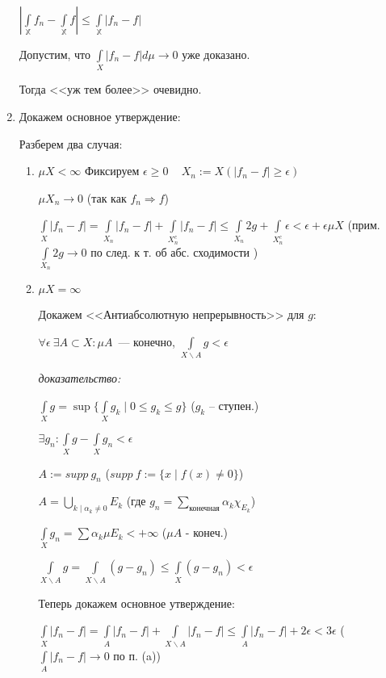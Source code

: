 \documentclass[paper=a4, fontsize=14pt]{report}
\begin{document}
\begin{flushleft}
\begin{enumerate}
	$ |\int\limits_{\mathbb{X}} f_n - \int\limits_{\mathbb{X}} f| \leq \int\limits_{\mathbb{X}} |f_n - f| $

	Допустим, что $\int\limits_{X} |f_n - f| d\mu \rightarrow 0$ уже доказано.

	Тогда <<уж тем более>> очевидно.

	\item Докажем основное утверждение:

	Разберем два случая:
	\begin{enumerate}
		\item $ \mu X < \infty $
		Фиксируем $ \epsilon \ge 0 $ ~ $ X_n := X(|f_n - f| \geq \epsilon) $

		$ \mu X_n \rightarrow 0 $ (так как $ f_n \Rightarrow f $)

		$ \int\limits_{X} |f_n - f| =
		\int\limits_{X_n} |f_n - f| + \int\limits_{X_n^c} |f_n - f| \leq
		\int\limits_{X_n} 2g + \int\limits_{X_n^c} \epsilon < \epsilon + \epsilon \mu X $ (прим. $ \int\limits_{X_n} 2g \rightarrow 0 $ по след. к т. об абс. сходимости )

		\item $ \mu X = \infty $

		Докажем <<Антиабсолютную непрерывность>> для $ g $:

		$ \forall \epsilon ~ \exists A \subset X: \mu A$~--- конечно,
		$ \int\limits_{X\backslash A} g < \epsilon $

		\textit{доказательство:}

		$ \int\limits_X g = \sup \{ \int\limits_{X} g_k \mid 0 \leq g_k \leq g \} $ ($ g_k $ -- ступен.)

		$ \exists g_n: \int\limits_{X} g - \int\limits_{X} g_n < \epsilon $

		$ A:= supp\ g_n $ ($ supp\ f :=  \{ x \mid f(x) \neq 0 \}$)

		$ A =  \bigcup\limits_{k \mid \alpha_k \neq 0} E_k $ (где $g_n=\sum\limits_{\text{конечная}} \alpha_k \chi_{E_k}$)

		$ \int\limits_{X} g_n  = \sum \alpha_k \mu E_k  < +\infty $ ($ \mu A $ - конеч.)

		$ \int\limits_{X\backslash A} g =
		\int\limits_{X\backslash A} (g - g_n) \leq
		\int\limits_{X} (g - g_n) < \epsilon $

		Теперь докажем основное утверждение:

		 $ \int\limits_{X} |f_n - f| =
		 \int\limits_{A} |f_n - f| + \int\limits_{X\backslash A} |f_n - f| \leq
		 \int\limits_{A} |f_n - f| + 2\epsilon < 3 \epsilon $
		 ($  \int\limits_{A} |f_n - f| \rightarrow 0$  по п. (a))
	\end{enumerate}
\end{enumerate}
\end{flushleft}
\end{document}
